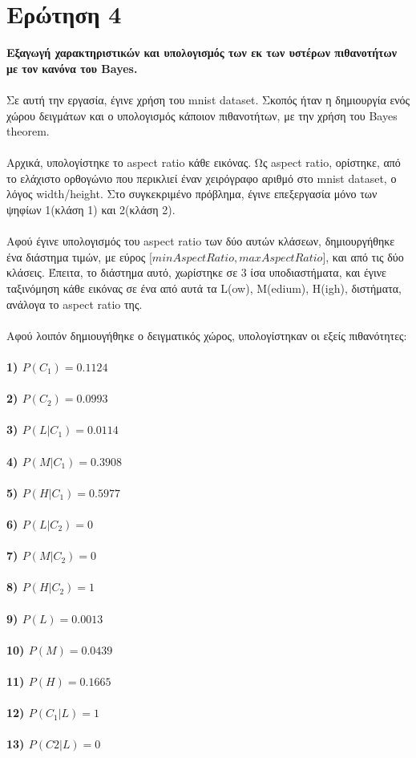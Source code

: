 \documentclass[12pt]{article}
\begin{document}
\section*{Ερώτηση 4}
{\bfseries  Εξαγωγή χαρακτηριστικών και υπολογισμός των εκ των υστέρων
πιθανοτήτων με τον κανόνα του Bayes.}\\\\
Σε αυτή την εργασία, έγινε χρήση του mnist dataset. Σκοπός ήταν η δημιουργία ενός χώρου δειγμάτων και ο υπολογισμός κάποιον πιθανοτήτων, με την χρήση του Bayes theorem.\\\\
Αρχικά, υπολογίστηκε το aspect ratio κάθε εικόνας. Ως aspect ratio, ορίστηκε, από το ελάχιστο ορθογώνιο που περικλιεί έναν χειρόγραφο αριθμό στο mnist dataset, ο λόγος width/height. Στο συγκεκριμένο πρόβλημα, έγινε επεξεργασία μόνο των ψηφίων 1(κλάση 1) και 2(κλάση 2).\\\\
Αφού έγινε υπολογισμός του aspect ratio των δύο αυτών κλάσεων, δημιουργήθηκε ένα διάστημα τιμών, με εύρος [$minAspectRatio , maxAspectRatio$], και από τις δύο κλάσεις. Έπειτα, το διάστημα αυτό, χωρίστηκε σε 3 ίσα υποδιαστήματα, και έγινε ταξινόμηση κάθε εικόνας σε ένα από αυτά τα L(ow), M(edium), H(igh), διστήματα, ανάλογα το aspect ratio της.\\\\
Αφού λοιπόν δημιουγήθηκε ο δειγματικός χώρος, υπολογίστηκαν οι εξείς πιθανότητες:\\\\
{\bfseries 1) \(P(C_1) = 0.1124\) \\\\
2) \(P(C_2) = 0.0993\) \\\\
3) \(P(L|C_1) = 0.0114\)\\\\
4) \(P(M|C_1) = 0.3908\)\\\\
5) \(P(H|C_1) = 0.5977\)\\\\
6) \(P(L|C_2) = 0\) \\\\
7) \(P(M|C_2) = 0\) \\\\
8) \(P(H|C_2) = 1\) \\\\
9) \(P(L) = 0.0013\) \\\\
10) \(P(M) = 0.0439\) \\\\
11) \(P(H) = 0.1665\) \\\\
12) \(P(C_1|L) = 1\) \\\\
13) \(P(C2|L) = 0\)}
\end{document}
